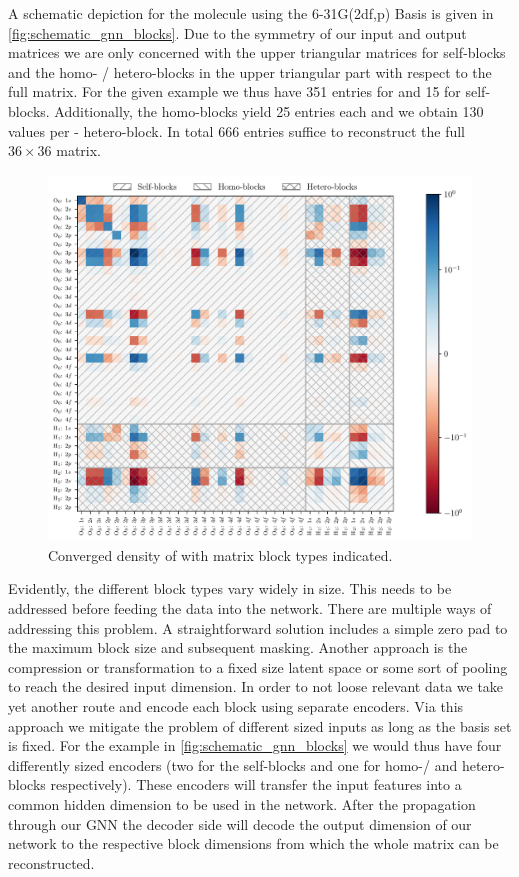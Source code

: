 A schematic depiction for the  molecule using the 6-31G(2df,p) Basis is given in \autoref{fig:schematic_gnn_blocks}. Due to the symmetry of our input and output matrices we are only concerned with the upper triangular matrices for self-blocks and the homo- / hetero-blocks in the upper triangular part with respect to the full matrix. For the given example we thus have 351 entries for  and 15 for  self-blocks. Additionally, the  homo-blocks yield 25 entries each and we obtain 130 values per - hetero-block. In total 666 entries suffice to reconstruct the full $36 \times 36$ matrix. 
\begin{figure}[H]
    \centering
    \includegraphics[width=\textwidth]{../fig/gnn/schematic_blocks.pdf}
    \caption[Matrix block regions of ]{Converged density of  with matrix block types indicated.}
    \label{fig:schematic_gnn_blocks}
\end{figure}
Evidently, the different block types vary widely in size. This needs to be addressed before feeding the data into the network. There are multiple ways of addressing this problem. A straightforward solution includes a simple zero pad to the maximum block size and subsequent masking. Another approach is the compression or transformation to a fixed size latent space or some sort of pooling to reach the desired input dimension. In order to not loose relevant data we take yet another route and encode each block using separate encoders. Via this approach we mitigate the problem of different sized inputs as long as the basis set is fixed. For the example in \autoref{fig:schematic_gnn_blocks} we would thus have four differently sized encoders (two for the self-blocks and one for homo-/ and hetero-blocks respectively). These encoders will transfer the input features into a common hidden dimension to be used in the network. After the propagation through our GNN the decoder side will decode the output dimension of our network to the respective block dimensions from which the whole matrix can be reconstructed.
